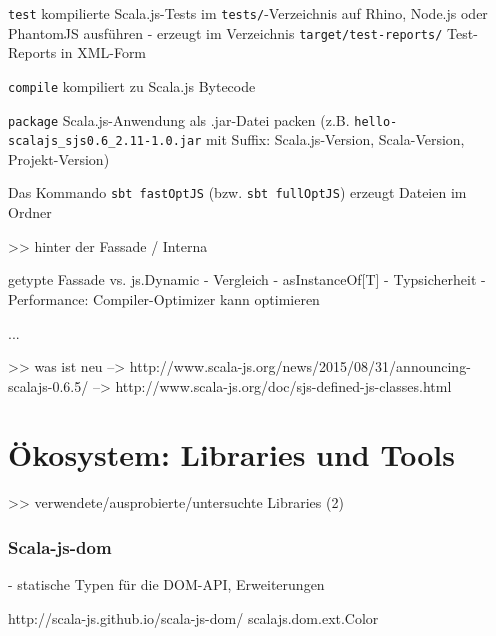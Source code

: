 \documentclass[a4paper, 12pt, hidelinks, listof=totoc, listoftables=totoc, bibliography=totoc]{scrreprt}
\begin{document}
\texttt{test} kompilierte Scala.js-Tests im \texttt{tests/}-Verzeichnis auf Rhino, Node.js oder PhantomJS ausführen
	- erzeugt im Verzeichnis \texttt{target/test-reports/} Test-Reports in XML-Form

\texttt{compile} kompiliert zu Scala.js Bytecode

\texttt{package} Scala.js-Anwendung als .jar-Datei packen (z.B. \texttt{hello-scalajs\_sjs0.6\_2.11-1.0.jar} mit Suffix: Scala.js-Version, Scala-Version, Projekt-Version)






Das Kommando \texttt{sbt fastOptJS} (bzw. \texttt{sbt fullOptJS}) erzeugt Dateien im Ordner












>> hinter der Fassade / Interna

getypte Fassade vs. js.Dynamic
- Vergleich
- asInstanceOf[T]
  - Typsicherheit
  - Performance: Compiler-Optimizer kann optimieren

...






>> was ist neu
  -->  http://www.scala-js.org/news/2015/08/31/announcing-scalajs-0.6.5/
  -->  http://www.scala-js.org/doc/sjs-defined-js-classes.html






\section{Ökosystem: Libraries und Tools}

>> verwendete/ausprobierte/untersuchte Libraries (2)

\subsubsection{Scala-js-dom}

- statische Typen für die DOM-API, Erweiterungen

http://scala-js.github.io/scala-js-dom/
scalajs.dom.ext.Color
\end{document}
